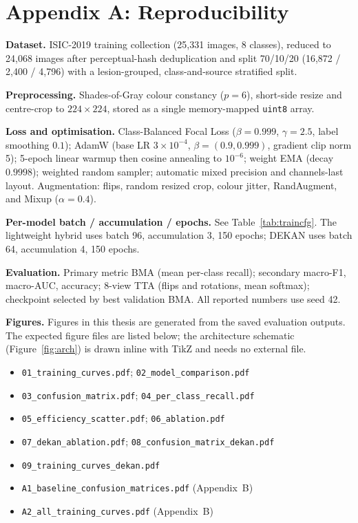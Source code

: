\section*{Appendix A: Reproducibility}

\textbf{Dataset.} ISIC-2019 training collection (25{,}331 images, 8 classes),
reduced to 24{,}068 images after perceptual-hash deduplication and split
70/10/20 (16{,}872 / 2{,}400 / 4{,}796) with a lesion-grouped, class-and-source
stratified split.

\textbf{Preprocessing.} Shades-of-Gray colour constancy ($p=6$), short-side
resize and centre-crop to $224\times224$, stored as a single memory-mapped
\texttt{uint8} array.

\textbf{Loss and optimisation.} Class-Balanced Focal Loss ($\beta=0.999$,
$\gamma=2.5$, label smoothing $0.1$); AdamW (base LR $3\times10^{-4}$,
$\beta=(0.9,0.999)$, gradient clip norm 5); 5-epoch linear warmup then cosine
annealing to $10^{-6}$; weight EMA (decay $0.9998$); weighted random sampler;
automatic mixed precision and channels-last layout. Augmentation: flips, random
resized crop, colour jitter, RandAugment, and Mixup ($\alpha=0.4$).

\textbf{Per-model batch / accumulation / epochs.} See Table~\ref{tab:traincfg}.
The lightweight hybrid uses batch 96, accumulation 3, 150 epochs; DEKAN uses
batch 64, accumulation 4, 150 epochs.

\textbf{Evaluation.} Primary metric BMA (mean per-class recall); secondary
macro-F1, macro-AUC, accuracy; 8-view TTA (flips and rotations, mean softmax);
checkpoint selected by best validation BMA. All reported numbers use seed 42.

\textbf{Figures.} Figures in this thesis are generated from the saved evaluation
outputs. The expected figure files are listed below; the architecture schematic
(Figure~\ref{fig:arch}) is drawn inline with TikZ and needs no external file.

\begin{itemize}
\item \texttt{01\_training\_curves.pdf}; \texttt{02\_model\_comparison.pdf}
\item \texttt{03\_confusion\_matrix.pdf}; \texttt{04\_per\_class\_recall.pdf}
\item \texttt{05\_efficiency\_scatter.pdf}; \texttt{06\_ablation.pdf}
\item \texttt{07\_dekan\_ablation.pdf}; \texttt{08\_confusion\_matrix\_dekan.pdf}
\item \texttt{09\_training\_curves\_dekan.pdf}
\item \texttt{A1\_baseline\_confusion\_matrices.pdf} (Appendix~B)
\item \texttt{A2\_all\_training\_curves.pdf} (Appendix~B)
\end{itemize}

